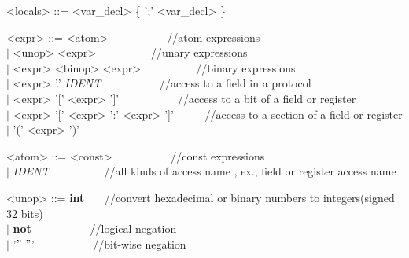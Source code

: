 \documentclass{article}
\begin{document}
\begin{grammar}
{\par}

{\renewcommand\baselinestretch{0}\selectfont
<locals>     ::=   <var\_decl> \{ ';' <var\_decl> \}

\par}

{\renewcommand\baselinestretch{0}\selectfont
<expr>     ::=   <atom> ~~~~~~~~~~//atom expressions  \\
     \hspace*{0.6cm} $\mid$  <unop> <expr>~~~~~~~~~~//unary expressions \\
     \hspace*{0.6cm} $\mid$  <expr> <binop> <expr>~~~~~~~~~~//binary expressions \\
     \hspace*{0.6cm} $\mid$  <expr> '.' \emph{IDENT} ~~~~~~~~~~//access to a field in a protocol  \\
     \hspace*{0.6cm} $\mid$  <expr> '[' <expr> ']' ~~~~~~~~~~//access to a bit of a field or register \\
     \hspace*{0.6cm} $\mid$  <expr> '[' <expr> ':' <expr> ']' ~~~~~//access to a section of a field or register \\
     \hspace*{0.6cm} $\mid$  '(' <expr> ')'

<atom>     ::=   <const> ~~~~~~~~~~//const expressions  \\
     \hspace*{0.6cm} $\mid$  \emph{IDENT}~~~~~~~~~~//all kinds of access name , ex., field or register access name 

<unop>     ::=   \textbf{int} ~~~//convert hexadecimal or binary numbers to integers(signed 32 bits) \\
     \hspace*{0.6cm} $\mid$  \textbf{not} ~~~~~~~~~~//logical negation \\
     \hspace*{0.6cm} $\mid$  '$"~"$' ~~~~~~~~~~//bit-wise negation

}
\end{grammar}
\end{document}
